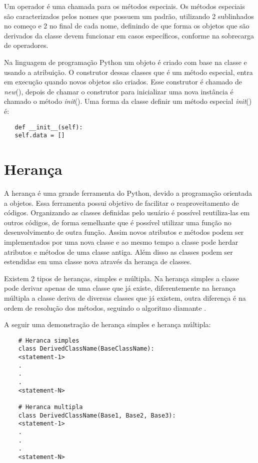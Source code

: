 	Um operador é uma chamada para os métodos especiais. Os métodos especiais são caracterizados pelos nomes que possuem um padrão, utilizando 2 sublinhados no começo e 2 no final de cada nome, definindo de que forma os objetos que são derivados da classe devem funcionar em casos específicos, conforme na sobrecarga de operadores.
	
	 Na linguagem de programação Python um objeto é criado com base na classe e usando a atribuição. O construtor dessas classes que é um método especial, entra em execução quando novos objetos são criados. Esse construtor é chamado de \textunderscore\textunderscore \textit{new}\textunderscore\textunderscore(), depois de chamar o construtor para inicializar uma nova instância é chamado o método \textunderscore\textunderscore \textit{init}\textunderscore\textunderscore(). Uma forma da classe definir um método especial \textunderscore\textunderscore \textit{init}\textunderscore\textunderscore() é:
	 \begin{lstlisting}
   def __init__(self):
   self.data = []
	 \end{lstlisting}
	 
	
    \section{Herança}
	A herança é uma grande ferramenta do Python, devido a programação orientada a objetos. Essa ferramenta possui objetivo de facilitar o reaproveitamento de códigos. Organizando as classes definidas pelo usuário é possível reutiliza-las em outros códigos, de forma semelhante que é possível utilizar uma função no desenvolvimento de outra função. Assim novos atributos e métodos podem ser implementados por uma nova classe e ao mesmo tempo a classe pode herdar atributos e métodos de uma classe antiga. Além disso as classes podem ser estendidas em uma classe nova através da herança de classes. 
	
	Existem 2 tipos de heranças, simples e múltipla. Na herança simples a classe pode derivar apenas de uma classe que já existe, diferentemente na herança múltipla a classe deriva de diversas classes que já existem, outra diferença é na ordem de resolução dos métodos, seguindo o algoritmo diamante \cite{Borges2014}.
	
	A seguir uma demonstração de herança simples e herança múltipla: 
	
	\begin{lstlisting}
    # Heranca simples
    class DerivedClassName(BaseClassName):
    <statement-1>
    .
    .
    .
    <statement-N>
		
    # Heranca multipla
    class DerivedClassName(Base1, Base2, Base3):
    <statement-1>
    .
    .
    .
    <statement-N>
	\end{lstlisting}
